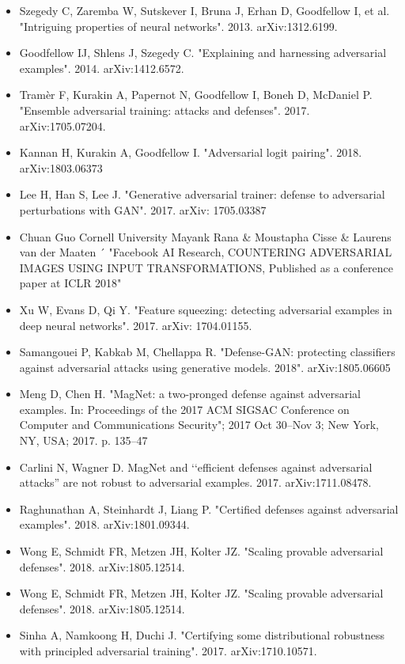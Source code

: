\documentclass[ 12pt,a4paper,twocolumn,fleqn]{article}
\begin{document}
\begin{itemize}
    \item Szegedy C, Zaremba W, Sutskever I, Bruna J, Erhan D, Goodfellow I, et al. "Intriguing properties of neural networks". 2013. arXiv:1312.6199.
    \item Goodfellow IJ, Shlens J, Szegedy C. "Explaining and harnessing adversarial examples". 2014. arXiv:1412.6572.
    \item Tramèr F, Kurakin A, Papernot N, Goodfellow I, Boneh D, McDaniel P. "Ensemble adversarial training: attacks and defenses". 2017. arXiv:1705.07204.
    \item Kannan H, Kurakin A, Goodfellow I. "Adversarial logit pairing". 2018. arXiv:1803.06373
    \item Lee H, Han S, Lee J. "Generative adversarial trainer: defense to adversarial perturbations with GAN". 2017. arXiv: 1705.03387
    \item Chuan Guo Cornell University Mayank Rana & Moustapha Cisse & Laurens van der Maaten ´ "Facebook AI Research, COUNTERING ADVERSARIAL IMAGES USING INPUT TRANSFORMATIONS, Published as a conference paper at ICLR 2018"
    \item Xu W, Evans D, Qi Y. "Feature squeezing: detecting adversarial examples in deep neural networks". 2017. arXiv: 1704.01155.
    \item Samangouei P, Kabkab M, Chellappa R. "Defense-GAN: protecting classifiers against adversarial attacks using generative models. 2018". arXiv:1805.06605
    \item Meng D, Chen H. "MagNet: a two-pronged defense against adversarial examples. In: Proceedings of the 2017 ACM SIGSAC Conference on Computer and Communications Security"; 2017 Oct 30–Nov 3; New York, NY, USA; 2017. p. 135–47
    \item Carlini N, Wagner D. MagNet and ‘‘efficient defenses against adversarial attacks” are not robust to adversarial examples. 2017. arXiv:1711.08478.
    \item Raghunathan A, Steinhardt J, Liang P. "Certified defenses against adversarial examples". 2018. arXiv:1801.09344.
    \item Wong E, Schmidt FR, Metzen JH, Kolter JZ. "Scaling provable adversarial defenses". 2018. arXiv:1805.12514.
    \item Wong E, Schmidt FR, Metzen JH, Kolter JZ. "Scaling provable adversarial defenses". 2018. arXiv:1805.12514.
    \item Sinha A, Namkoong H, Duchi J. "Certifying some distributional robustness with principled adversarial training". 2017. arXiv:1710.10571.

\end{itemize}
\end{document}

